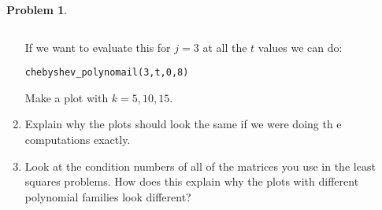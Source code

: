 \documentclass[12pt]{article}
\theoremstyle{definition}
\newtheorem{problem}{Problem}
\begin{document}
\begin{problem}
\begin{enumerate}
\begin{lstlisting}
        \end{lstlisting}

        If we want to evaluate this for $j=3$ at all the $t$ values we can do:
        \begin{lstlisting}
chebyshev_polynomail(3,t,0,8)
        \end{lstlisting} 

        Make a plot with $k=5,10,15$.

        \item Explain why the plots should look the same if we were doing th e computations exactly.
        
        \item Look at the condition numbers of all of the matrices you use in the least squares problems. 
        How does this explain why the plots with different polynomial families look different?

    \end{enumerate}

\end{problem}
\end{document}
